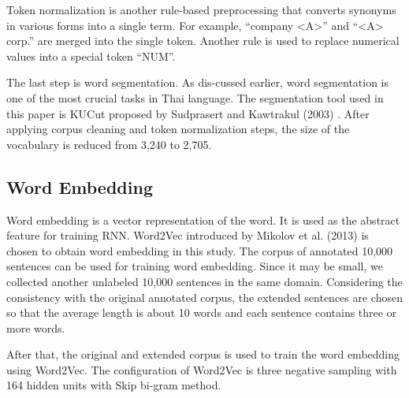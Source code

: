 Token normalization is another rule-based preprocessing that converts
synonyms in various forms into a single term. 
For example, ``company <A>'' and ``<A> corp.'' are merged into the single token. 
Another rule is used to replace numerical values into a special token ``NUM''.


The last step is word segmentation. 
As dis-cussed earlier, word segmentation is one of the most crucial
tasks in Thai language. 
The segmentation tool used in this paper is KUCut proposed by 
Sudprasert and Kawtrakul (2003) \cite{sudprasert2003thai}.
After applying corpus cleaning and token normalization steps,
the size of the vocabulary is reduced from 3,240 to 2,705.

\subsection{Word Embedding}
Word embedding is a vector representation of the word. 
It is used as the abstract feature for training RNN. 
Word2Vec introduced by Mikolov et al. (2013) \cite{mikolov2013distributed} 
is chosen to obtain word embedding in this study. 
The corpus of annotated 10,000 sentences can be used for training word embedding. 
Since it may be small, we collected another unlabeled 10,000 sentences
in the same domain. Considering the consistency with the original annotated corpus, 
the extended sentences are chosen so that the average length is 
about 10 words and each sentence contains three or more words.


After that, the original and extended corpus is used to 
train the word embedding using Word2Vec. 
The configuration of Word2Vec is three negative sampling with 164 
hidden units with Skip bi-gram method.

